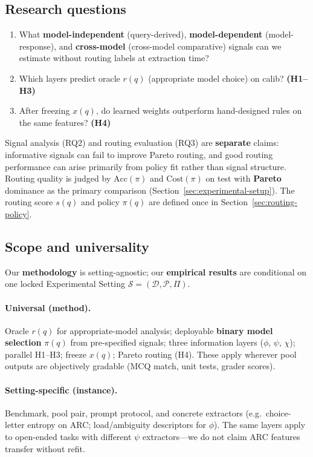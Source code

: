 \subsection{Research questions}

\begin{enumerate}
  \item[RQ1.] What \textbf{model-independent} (query-derived), \textbf{model-dependent} (model-response), and \textbf{cross-model} (cross-model comparative) signals can we estimate without routing labels at extraction time?
  \item[RQ2.] Which layers predict oracle $r(q)$ (appropriate model choice) on calib? \textbf{(H1--H3)}
  \item[RQ3.] After freezing $x(q)$, do learned weights outperform hand-designed rules on the same features? \textbf{(H4)}
\end{enumerate}

Signal analysis (RQ2) and routing evaluation (RQ3) are \textbf{separate} claims: informative signals can fail to improve Pareto routing, and good routing performance can arise primarily from policy fit rather than signal structure.
Routing quality is judged by $\mathrm{Acc}(\pi)$ and $\mathrm{Cost}(\pi)$ on test with \textbf{Pareto} dominance as the primary comparison (Section~\ref{sec:experimental-setup}).
The routing score $s(q)$ and policy $\pi(q)$ are defined once in Section~\ref{sec:routing-policy}.

\subsection{Scope and universality}
\label{sec:scope}

Our \textbf{methodology} is setting-agnostic; our \textbf{empirical results} are conditional on one locked Experimental Setting $\mathcal{S}=(\mathcal{D},\mathcal{P},\Pi)$.

\paragraph{Universal (method).}
Oracle $r(q)$ for appropriate-model analysis; deployable \textbf{binary model selection} $\pi(q)$ from pre-specified signals; three information layers ($\phi$, $\psi$, $\chi$); parallel H1--H3; freeze $x(q)$; Pareto routing (H4).
These apply wherever pool outputs are objectively gradable (MCQ match, unit tests, grader scores).

\paragraph{Setting-specific (instance).}
Benchmark, pool pair, prompt protocol, and concrete extractors (e.g.\ choice-letter entropy on ARC; load/ambiguity descriptors for $\phi$).
The same layers apply to open-ended tasks with different $\psi$ extractors---we do not claim ARC features transfer without refit.

